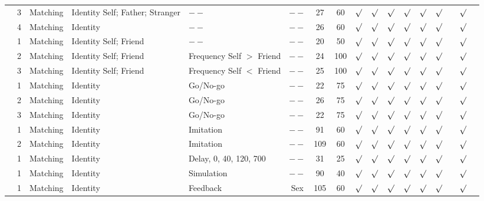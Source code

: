 \documentclass[sn-apa]{sn-jnl}%
\theoremstyle{thmstyleone}%
\theoremstyle{thmstyletwo}%
\theoremstyle{thmstylethree}%
\begin{document}
\begin{table}
\begin{tabular*}{\textwidth}{@{\extracolsep\fill}lccp{1cm}p{1cm}cccccccccccc}
		\textcite{navon2021are} & 3 & Matching & Identity Self; Father; Stranger\centering & $--$\centering & $--$ & 27 & 60 & $\surd$ & $\surd$ & $\surd$ & $\surd$  & $\surd$ & $\surd$ & & $\surd$ \\
		& 4 & Matching & Identity\centering & $--$\centering & $--$ & 26 & 60 & $\surd$ & $\surd$ & $\surd$ & $\surd$  & $\surd$ & $\surd$ & & $\surd$ \\
		& 1 & Matching & Identity Self; Friend\centering & $--$\centering & $--$ & 20 & 50 & $\surd$ & $\surd$ & $\surd$ & $\surd$  & $\surd$ & $\surd$ & & $\surd$ \\
		\textcite{svensson2022more} & 2 & Matching & Identity Self; Friend\centering & Frequency Self $>$ Friend\centering  & $--$ & 24 & 100 & $\surd$ & $\surd$ & $\surd$ & $\surd$  & $\surd$ & $\surd$ & & $\surd$ \\
		& 3 & Matching & Identity Self; Friend\centering & Frequency Self $<$ Friend\centering & $--$ & 25 & 100 & $\surd$ & $\surd$ & $\surd$ & $\surd$  & $\surd$ & $\surd$ & & $\surd$ \\
		\textcite{cheng2019saliency} & 1 & Matching & Identity\centering & Go/No-go\centering & $--$ & 22 & 75 & $\surd$ & $\surd$ & $\surd$ & $\surd$  & $\surd$ & $\surd$ & & $\surd$ \\ 
		& 2 & Matching & Identity\centering & Go/No-go\centering & $--$ & 26 & 75 & $\surd$ & $\surd$ & $\surd$ & $\surd$  & $\surd$ & $\surd$ & & $\surd$ \\ 
		& 3 & Matching & Identity\centering & Go/No-go\centering & $--$ & 22 & 75 & $\surd$ & $\surd$ & $\surd$ & $\surd$  & $\surd$ & $\surd$ & & $\surd$ \\ 
		\textcite{bukowski2021socio} & 1 & Matching & Identity\centering & Imitation\centering & $--$ & 91 & 60 & $\surd$ & $\surd$ & $\surd$ & $\surd$  & $\surd$ & $\surd$ & & $\surd$ \\ 
		& 2 & Matching & Identity\centering & Imitation\centering & $--$ & 109 & 60 & $\surd$ & $\surd$ & $\surd$ & $\surd$  & $\surd$ & $\surd$ & & $\surd$ \\ 
		\textcite{kolvoort2020temporal} & 1 & Matching & Identity\centering & Delay, 0, 40, 120, 700\centering & $--$ & 31 & 25 & $\surd$ & $\surd$ & $\surd$ & $\surd$  & $\surd$ & $\surd$ & & $\surd$ \\ 
		\textcite{martinez2020examining} & 1 & Matching & Identity\centering & Simulation\centering & $--$ & 90 & 40 & $\surd$ & $\surd$ & $\surd$ & $\surd$  & $\surd$ & $\surd$ & & $\surd$ \\ 
		\textcite{xu2021romantic} & 1 & Matching & Identity\centering & Feedback\centering & Sex & 105 & 60 & $\surd$ & $\surd$ & $\surd$ & $\surd$  & $\surd$ & $\surd$ & & $\surd$ \\ 

\end{tabular*}
\end{table}
\end{document}
